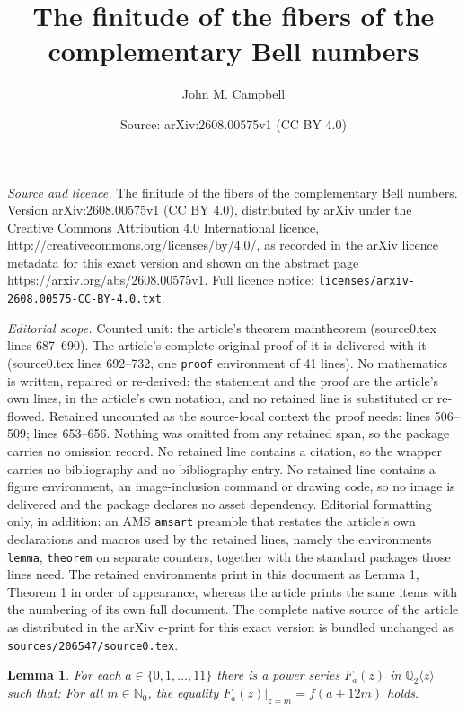 \documentclass[10pt,a4paper]{amsart}
\title{The finitude of the fibers of the complementary Bell numbers}
\author{John M. Campbell}
\date{Source: arXiv:2608.00575v1 (CC BY 4.0)}
\newtheorem{lemma}{Lemma}
\begin{document}
\maketitle

\noindent\emph{Source and licence.} The finitude of the fibers of the complementary Bell numbers. Version arXiv:2608.00575v1 (CC BY 4.0), distributed by arXiv under the Creative Commons Attribution 4.0 International licence, http://creativecommons.org/licenses/by/4.0/, as recorded in the arXiv licence metadata for this exact version and shown on the abstract page https://arxiv.org/abs/2608.00575v1. Full licence notice: \texttt{licenses/arxiv-2608.00575-CC-BY-4.0.txt}.\par\smallskip

\noindent\textit{Editorial scope.} Counted unit: the article's theorem maintheorem (source0.tex lines 687--690). The article's complete original proof of it is delivered with it (source0.tex lines 692--732, one \texttt{proof} environment of 41 lines). No mathematics is written, repaired or re-derived: the statement and the proof are the article's own lines, in the article's own notation, and no retained line is substituted or re-flowed.  Retained uncounted as the source-local context the proof needs: lines 506--509; lines 653--656.  Nothing was omitted from any retained span, so the package carries no omission record.  No retained line contains a citation, so the wrapper carries no bibliography and no bibliography entry.  No retained line contains a figure environment, an image-inclusion command or drawing code, so no image is delivered and the package declares no asset dependency.  Editorial formatting only, in addition: an AMS \texttt{amsart} preamble that restates the article's own declarations and macros used by the retained lines, namely the environments \texttt{lemma}, \texttt{theorem} on separate counters, together with the standard packages those lines need.  The retained environments print in this document as Lemma 1, Theorem 1 in order of appearance, whereas the article prints the same items with the numbering of its own full document.  The complete native source of the article as distributed in the arXiv e-print for this exact version is bundled unchanged as \texttt{sources/206547/source0.tex}.
\begin{lemma}\label{lemmaFf}
 For each $a \in \{ 0, 1, \ldots, 11 \}$   there is a power series $F_{a}(z)$ in $\mathbb{Q}_{2}\langle z \rangle$   such that:   For all $m \in  
  \mathbb{N}_{0}$, the equality   $F_{a}(z) |_{z = m} = f(a + 12 m)$ holds. 
\end{lemma}
\end{document}
